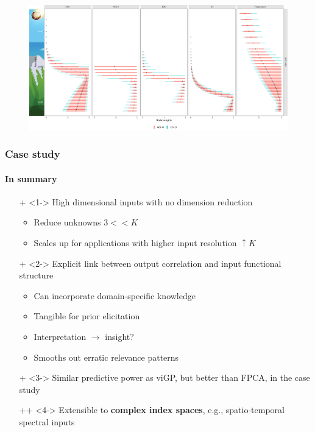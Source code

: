 \documentclass[handout]{snedecorbeamer}
\begin{document}
\begin{frame}[c]
  \begin{figure}
    \centering
    \includegraphics[width=1\textwidth]{image2934-8.png}
  \end{figure}
\end{frame}

\begin{frame}
  \frametitle{Case study}
  \framesubtitle{In summary}

  \begin{itemize}
  \item[+]<1-> High dimensional inputs with no dimension reduction
    \begin{itemize}
    \item Reduce unknowns $3 << K$
    \item Scales up for applications with higher input resolution
      $\uparrow K$
    \end{itemize}
  \item[+]<2-> Explicit link between output correlation and
    input functional structure
    \begin{itemize}
    \item<2-> Can incorporate domain-specific knowledge
    \item<2-> Tangible for prior elicitation
    \item<2-> Interpretation $\to$ insight?
    \item<2-> Smooths out erratic relevance patterns
    \end{itemize}
  \item[+]<3-> Similar predictive power as viGP, but better than FPCA, in the
    case study~\hyperlink{frm:validation-statistics}{}
  \item[++]<4-> Extensible to \alert{\textbf{complex
        index spaces}}, e.g., spatio-temporal spectral inputs
  \end{itemize}
\end{frame}
\end{document}
